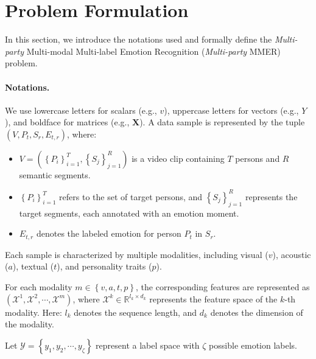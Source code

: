 
\section{Problem Formulation}
\label{gen_inst}

In this section, we introduce the notations used and formally define the \textit{Multi-party} Multi-modal Multi-label Emotion Recognition (\textit{Multi-party} MMER) problem.

\paragraph{Notations.}
We use lowercase letters for scalars (e.g., $v$), uppercase letters for vectors (e.g., $Y$), and boldface for matrices (e.g., $\bm{X}$).
A data sample is represented by the tuple $\left( V, P_{t}, S_{r}, E_{t,r} \right)$, where:

\begin{itemize}
    \item $V = \left( \left\{ P_i \right\}_{i=1}^T, \left\{ S_j \right\}_{j=1}^R \right)$ is a video clip containing $T$ persons and $R$ semantic segments.
    \item $\left\{ P_i \right\}_{i=1}^T$ refers to the set of target persons, and $\left\{ S_j \right\}_{j=1}^R$ represents the target segments, each annotated with an emotion moment.
    \item $E_{t,r}$ denotes the labeled emotion for person $P_{t}$ in  $S_{r}$.
\end{itemize}

Each sample is characterized by multiple modalities, including visual ($v$), acoustic ($a$), textual ($t$), and personality traits ($p$). 

For each modality $m \in \left\{ v, a, t, p \right\}$, the corresponding features are represented as $\left( \bm{\mathcal X}^{1}, \bm{\mathcal X}^{2}, \cdots, \bm{\mathcal X}^{m} \right)$, where $\bm{\mathcal X}^{k} \in \mathbb{R}^{l_k \times d_k}$ represents the feature space of the $k$-th modality. Here:
$l_k$ denotes the sequence length, and
$d_k$ denotes the dimension of the modality.

Let $\mathcal{Y} = \left\{ y_{1}, y_{2}, \cdots, y_{\zeta} \right\}$ represent a label space with $\zeta$ possible emotion labels. 




